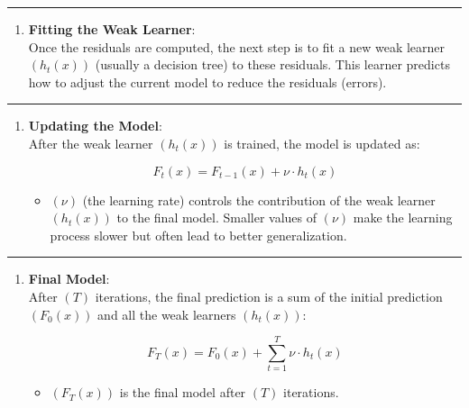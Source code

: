 \documentclass[12pt]{book}
\providecommand{\tightlist}{%
  \setlength{\itemsep}{0pt}\setlength{\parskip}{0pt}}
\begin{document}
\begin{center}\rule{0.5\linewidth}{0.5pt}\end{center}

\begin{enumerate}
\def\labelenumi{\arabic{enumi}.}
\setcounter{enumi}{3}
\tightlist
\item
  \textbf{Fitting the Weak Learner}:\\
  Once the residuals are computed, the next step is to fit a new weak
  learner \(( h_t(x) )\) (usually a decision tree) to these residuals.
  This learner predicts how to adjust the current model to reduce the
  residuals (errors).
\end{enumerate}

\begin{center}\rule{0.5\linewidth}{0.5pt}\end{center}

\begin{enumerate}
\def\labelenumi{\arabic{enumi}.}
\setcounter{enumi}{4}
\item
  \textbf{Updating the Model}:\\
  After the weak learner \(( h_t(x) )\) is trained, the model is updated
  as:

  \[
  F_t(x) = F_{t-1}(x) + \nu \cdot h_t(x)
  \]

  \begin{itemize}
  \tightlist
  \item
    \(( \nu )\) (the learning rate) controls the contribution of the
    weak learner \(( h_t(x) )\) to the final model. Smaller values of
    \(( \nu )\) make the learning process slower but often lead to
    better generalization.
  \end{itemize}
\end{enumerate}

\begin{center}\rule{0.5\linewidth}{0.5pt}\end{center}

\begin{enumerate}
\def\labelenumi{\arabic{enumi}.}
\setcounter{enumi}{5}
\item
  \textbf{Final Model}:\\
  After \(( T )\) iterations, the final prediction is a sum of the
  initial prediction \(( F_0(x) )\) and all the weak learners
  \(( h_t(x) )\):

  \[
  F_T(x) = F_0(x) + \sum_{t=1}^{T} \nu \cdot h_t(x)
  \]

  \begin{itemize}
  \tightlist
  \item
    \(( F_T(x) )\) is the final model after \(( T )\) iterations.
  \end{itemize}
\end{enumerate}
\end{document}
